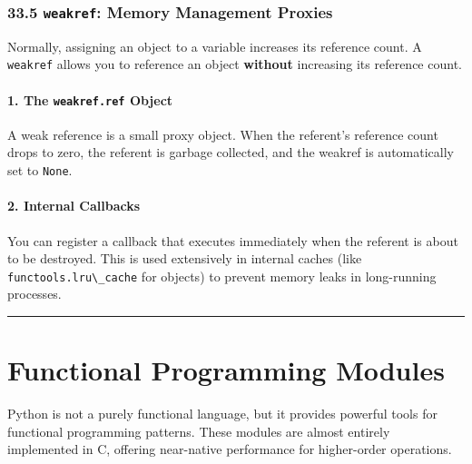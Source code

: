 \hypertarget{weakref-memory-management-proxies}{%
\subsection{\texorpdfstring{33.5 \texttt{weakref}: Memory Management
Proxies}{33.5 weakref: Memory Management Proxies}}\label{weakref-memory-management-proxies}}

Normally, assigning an object to a variable increases its reference
count. A \passthrough{\lstinline!weakref!} allows you to reference an
object \textbf{without} increasing its reference count.

\hypertarget{the-weakref.ref-object}{%
\subsubsection{\texorpdfstring{1. The \texttt{weakref.ref}
Object}{1. The weakref.ref Object}}\label{the-weakref.ref-object}}

A weak reference is a small proxy object. When the referent's reference
count drops to zero, the referent is garbage collected, and the weakref
is automatically set to \passthrough{\lstinline!None!}.

\hypertarget{internal-callbacks}{%
\subsubsection{2. Internal Callbacks}\label{internal-callbacks}}

You can register a callback that executes immediately when the referent
is about to be destroyed. This is used extensively in internal caches
(like \passthrough{\lstinline!functools.lru\_cache!} for objects) to
prevent memory leaks in long-running processes.

\begin{center}\rule{0.5\linewidth}{0.5pt}\end{center}

\hypertarget{functional-programming-modules}{%
\chapter{Functional Programming
Modules}\label{functional-programming-modules}}

Python is not a purely functional language, but it provides powerful
tools for functional programming patterns. These modules are almost
entirely implemented in C, offering near-native performance for
higher-order operations.

